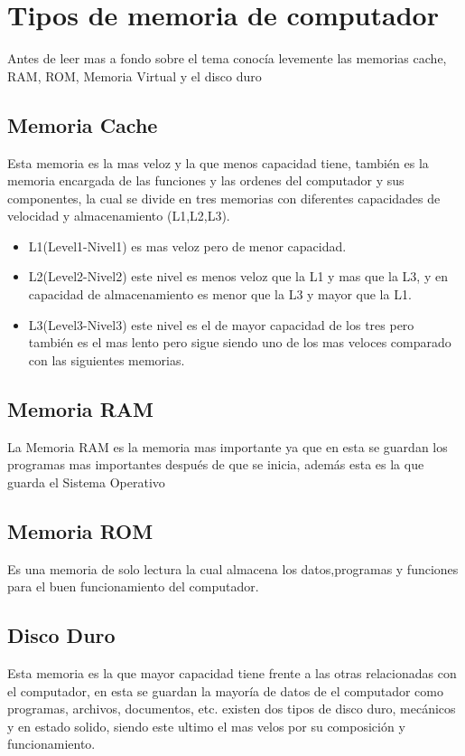 \documentclass{article}
\begin{document}
	\section{Tipos de memoria de computador} \label{contenido}
	Antes de leer mas a fondo sobre el tema conocía levemente las memorias cache, RAM, ROM, Memoria Virtual y el disco duro
	\subsection{Memoria Cache}
	Esta memoria es la mas veloz y la que menos capacidad tiene, también es la memoria encargada de las funciones y las ordenes del computador y sus componentes, la cual se divide en tres memorias con diferentes capacidades de velocidad y almacenamiento  (L1,L2,L3).
	\begin{itemize}
		\item{L1(Level1-Nivel1) es mas veloz pero de menor capacidad.}
		\item{L2(Level2-Nivel2) este nivel es menos veloz que la L1 y mas que la L3, y en capacidad de almacenamiento es menor que la L3 y mayor que la L1.}
		\item {L3(Level3-Nivel3) este nivel es el de mayor capacidad de los tres pero también es el mas lento pero sigue siendo uno de los mas veloces comparado con las siguientes memorias.}
	\end{itemize}
	
	\subsection{Memoria RAM}
	La Memoria RAM es la memoria mas importante ya que en esta se guardan los programas mas importantes después de que se inicia, además esta es la que guarda el Sistema Operativo
	
	\subsection{Memoria ROM}
	Es una memoria de solo lectura la cual almacena los datos,programas y funciones para el buen funcionamiento del computador. \cite{rom}
	
	\subsection{Disco Duro}
	Esta memoria es la que mayor capacidad tiene frente a las otras relacionadas con el computador, en esta se guardan la mayoría de datos de el computador como programas, archivos, documentos, etc. existen dos tipos de disco duro, mecánicos y en estado solido, siendo este ultimo el mas velos por su composición y funcionamiento.
	
\end{document}
